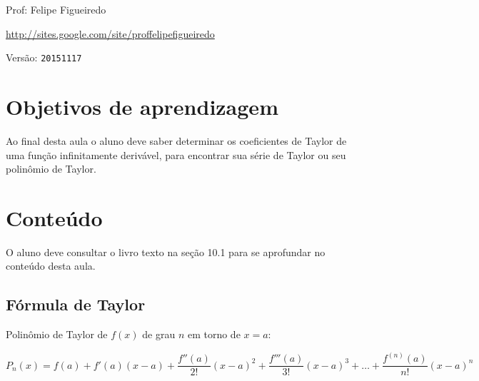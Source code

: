 \documentclass[a4paper]{article}
\begin{document}
\parbox[c]{.825\textwidth}{\raggedright%
{Prof: Felipe Figueiredo\par}
{\url{http://sites.google.com/site/proffelipefigueiredo}\par}
}

Versão: \verb|20151117|



\section{Objetivos de aprendizagem}

Ao final desta aula o aluno deve saber determinar os coeficientes de Taylor de uma função infinitamente derivável, para encontrar sua série de Taylor ou seu polinômio de Taylor.



\section{Conteúdo}

O aluno deve consultar o livro texto na seção 10.1 para se aprofundar no conteúdo desta aula.

\subsection{Fórmula de Taylor}

Polinômio de Taylor de $f(x)$ de grau $n$ em torno de $x=a$:

\begin{displaymath}
P_n(x) = f(a) + f'(a)(x-a) + \frac{f''(a)}{2!}(x-a)^2 + \frac{f'''(a)}{3!}(x-a)^3 + \ldots + \frac{f^{(n)}(a)}{n!}(x-a)^n
\end{displaymath}
\end{document}
